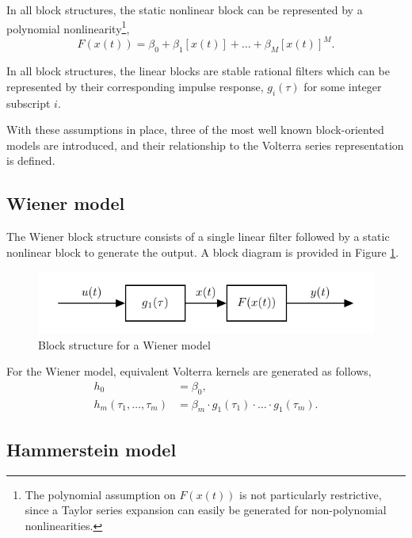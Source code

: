 \begin{assum}
\label{assum:polynomialnonlin_Chap3}
In all block structures, the static nonlinear block can be represented by a polynomial nonlinearity\footnote{The polynomial assumption on $F(x(t))$ is not particularly restrictive, since a Taylor series expansion can easily be generated for non-polynomial nonlinearities.},
$$F(x(t)) = \beta_0 + \beta_1 [x(t)] + \hdots + \beta_M [x(t)]^M.$$
\end{assum}

\begin{assum}
\label{assum:linearblock_Chap3}
In all block structures, the linear blocks are stable rational filters which can be represented by their corresponding impulse response, $g_i(\tau)$ for some integer subscript $i$.
\end{assum}

With these assumptions in place, three of the most well known block-oriented models are introduced, and their relationship to the Volterra series representation is defined.

\subsection{Wiener model}

The Wiener block structure consists of a single linear filter followed by a static nonlinear block to generate the output. A block diagram is provided in Figure \ref{fig:WienerBS}.

\begin{figure}[!h]
\centering
\includegraphics[scale=1]{Chapter3_VolterraSeries/WienerSystem.pdf}
\caption{Block structure for a Wiener model}
\label{fig:WienerBS}
\end{figure}

For the Wiener model, equivalent Volterra kernels are generated as follows,
\begin{align}
h_0 &= \beta_0, \nonumber \\
h_m(\tau_1,\hdots,\tau_m) &= \beta_m \cdot g_1(\tau_1) \cdot \hdots \cdot g_1(\tau_m).
\end{align}

\subsection{Hammerstein model}


